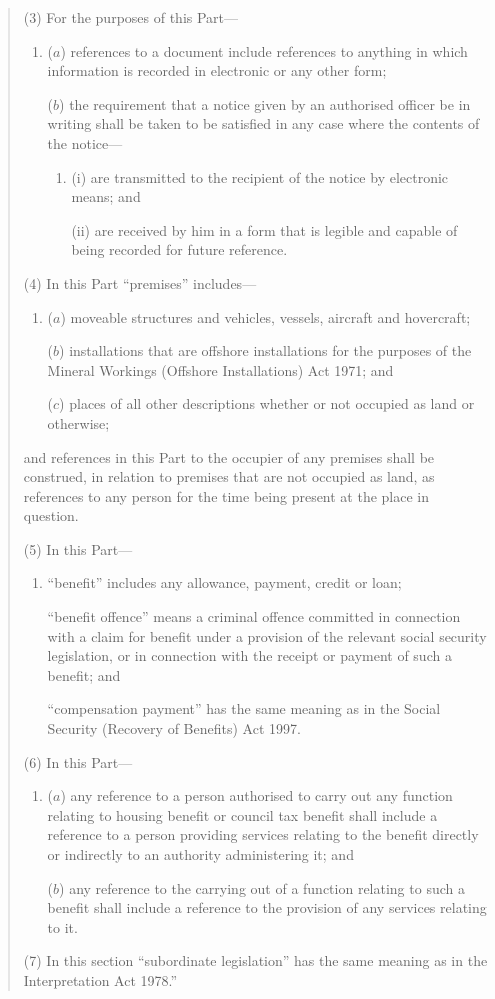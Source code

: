 \documentclass[12pt,a4paper]{article}
\begin{document}
\begin{quotation}
(3) For the purposes of this Part—
\begin{enumerate}\item[]
($a$) references to a document include references to anything in which information is recorded in electronic or any other form;

($b$) the requirement that a notice given by an authorised officer be in writing shall be taken to be satisfied in any case where the contents of the notice—
\begin{enumerate}\item[]
(i) are transmitted to the recipient of the notice by electronic means; and

(ii) are received by him in a form that is legible and capable of being recorded for future reference.
\end{enumerate}
\end{enumerate}

(4) In this Part “premises” includes—
\begin{enumerate}\item[]
($a$) moveable structures and vehicles, vessels, aircraft and hovercraft;

($b$) installations that are offshore installations for the purposes of the Mineral Workings (Offshore Installations) Act 1971; and

($c$) places of all other descriptions whether or not occupied as land or otherwise;
\end{enumerate}
and references in this Part to the occupier of any premises shall be construed, in relation to premises that are not occupied as land, as references to any person for the time being present at the place in question.

(5) In this Part—
\begin{enumerate}\item[]
    “benefit” includes any allowance, payment, credit or loan;

    “benefit offence” means a criminal offence committed in connection with a claim for benefit under a provision of the relevant social security legislation, or in connection with the receipt or payment of such a benefit; and

    “compensation payment” has the same meaning as in the Social Security (Recovery of Benefits) Act 1997.  
\end{enumerate}

(6) In this Part—
\begin{enumerate}\item[]
($a$) any reference to a person authorised to carry out any function relating to housing benefit or council tax benefit shall include a reference to a person providing services relating to the benefit directly or indirectly to an authority administering it; and

($b$) any reference to the carrying out of a function relating to such a benefit shall include a reference to the provision of any services relating to it.
\end{enumerate}

(7) In this section “subordinate legislation” has the same meaning as in the Interpretation Act 1978.”
\end{quotation}
\end{document}
